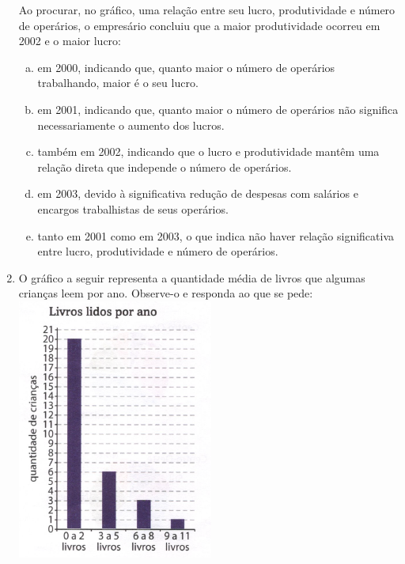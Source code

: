 \documentclass[a4paper,14pt]{article}
\begin{document}
\begin{multicols}{2}
\begin{enumerate}
			Ao procurar, no gráfico, uma relação entre seu lucro, produtividade e número de operários, o empresário concluiu que a maior produtividade ocorreu em 2002 e o maior lucro:
			\begin{enumerate}[a)]
				\item em 2000, indicando que, quanto maior o número de operários trabalhando, maior é o seu lucro.
				\item em 2001, indicando que, quanto maior o número de operários não significa necessariamente o aumento dos lucros.
				\item também em 2002, indicando que o lucro e produtividade mantêm uma relação direta que independe o número de operários.
				\item em 2003, devido à significativa redução de despesas com salários e encargos trabalhistas de seus operários.
				\item tanto em 2001 como em 2003, o que indica não haver relação significativa entre lucro, produtividade e número de operários.
			\end{enumerate}
			\item O gráfico a seguir representa a quantidade média de livros que algumas crianças leem por ano. Observe-o e responda ao que se pede:
			\\
			\includegraphics[width=1\linewidth]{6FMA119_imagens/imagem7}

\end{enumerate}
\end{multicols}
\end{document}
